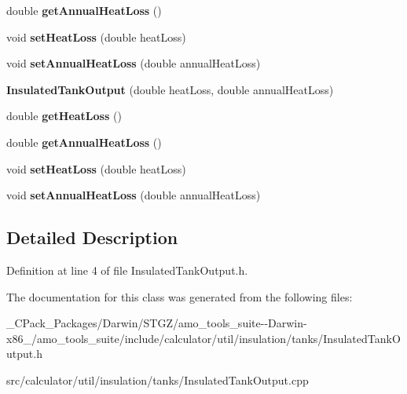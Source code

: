 \begin{DoxyCompactItemize}
double {\bfseries get\+Annual\+Heat\+Loss} ()
\item 
\mbox{\label{class_insulated_tank_output_a45aff6f1036a0d45931c2e00212b6e30}} 
void {\bfseries set\+Heat\+Loss} (double heat\+Loss)
\item 
\mbox{\label{class_insulated_tank_output_a6430853b51b8a547f17a5e74300e6fb5}} 
void {\bfseries set\+Annual\+Heat\+Loss} (double annual\+Heat\+Loss)
\item 
\mbox{\label{class_insulated_tank_output_a83fcbf8eb49d7bfd346882d92e21738a}} 
{\bfseries Insulated\+Tank\+Output} (double heat\+Loss, double annual\+Heat\+Loss)
\item 
\mbox{\label{class_insulated_tank_output_a99aff99468ba3edc7dd1eaabb1f77516}} 
double {\bfseries get\+Heat\+Loss} ()
\item 
\mbox{\label{class_insulated_tank_output_abcfec4ccd75cac48c2d5704bf3607f2e}} 
double {\bfseries get\+Annual\+Heat\+Loss} ()
\item 
\mbox{\label{class_insulated_tank_output_a45aff6f1036a0d45931c2e00212b6e30}} 
void {\bfseries set\+Heat\+Loss} (double heat\+Loss)
\item 
\mbox{\label{class_insulated_tank_output_a6430853b51b8a547f17a5e74300e6fb5}} 
void {\bfseries set\+Annual\+Heat\+Loss} (double annual\+Heat\+Loss)
\end{DoxyCompactItemize}


\subsection{Detailed Description}


Definition at line 4 of file Insulated\+Tank\+Output.\+h.



The documentation for this class was generated from the following files\+:\begin{DoxyCompactItemize}
\item 
\+\_\+\+C\+Pack\+\_\+\+Packages/\+Darwin/\+S\+T\+G\+Z/amo\+\_\+tools\+\_\+suite-\/-\/\+Darwin-\/x86\+\_/amo\+\_\+tools\+\_\+suite/include/calculator/util/insulation/tanks/Insulated\+Tank\+Output.\+h\item 
src/calculator/util/insulation/tanks/Insulated\+Tank\+Output.\+cpp\end{DoxyCompactItemize}
